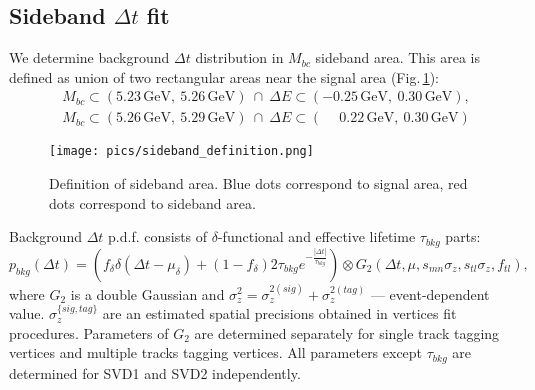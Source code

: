 \documentclass[preprint,aps,showpacs]{revtex4}
\newcommand{\dt}{\ensuremath{\Delta t}\xspace}
\newcommand{\de}{\ensuremath{\Delta E}\xspace}
\newcommand{\mbc}{\ensuremath{M_{bc}}\xspace}
\begin{document}
\subsection{Sideband \dt fit}\label{sec:mc_sideband_fit}
We determine background $\Delta t$ distribution in \mbc sideband area. This area is defined as union of two rectangular areas near the signal area (Fig.\,\ref{fig:SidebandDefinition}):
\begin{equation}\label{eq:de-mbc-sideband-area}
\begin{split}
&\mbc \subset \left(5.23\,\text{GeV},\ 5.26\,\text{GeV}\right)\ \cap\ \de \subset \left(-0.25\,\text{GeV},\ 0.30\,\text{GeV}\right),\\
&\mbc \subset \left(5.26\,\text{GeV},\ 5.29\,\text{GeV}\right)\ \cap\ \de \subset \left(\phantom{-}0.22\,\text{GeV},\ 0.30\,\text{GeV}\right)
\end{split}
\end{equation}

\begin{figure}[htb]
\texttt{[image: pics/sideband\_definition.png]}\\
 \caption{Definition of sideband area. Blue dots correspond to signal area, red dots correspond to sideband area.}
\label{fig:SidebandDefinition}
\end{figure}

Background \dt p.d.f. consists of $\delta$-functional and effective lifetime $\tau_{bkg}$ parts:
\begin{equation}\label{eq:dt_sideband}
  p_{bkg}(\Delta t) = \left(f_{\delta}\delta(\Delta t - \mu_{\delta})+(1-f_{\delta})2\tau_{bkg}e^{-\frac{|\Delta t|}{\tau_{bkg}}}\right)\otimes G_2\left(\Delta t,\mu,s_{mn}\sigma_z,s_{tl}\sigma_z,f_{tl}\right),
 \end{equation}
where $G_2$ is a double Gaussian and $\sigma^2_z=\sigma_z^{2(sig)}+\sigma_z^{2(tag)}$ --- event-dependent value. $\sigma_z^{\{sig,tag\}}$ are an estimated spatial precisions obtained in vertices fit procedures.
Parameters of $G_2$ are determined separately for single track tagging vertices and multiple tracks tagging vertices. All parameters except $\tau_{bkg}$ are determined for SVD1 and SVD2 independently.
\end{document}
